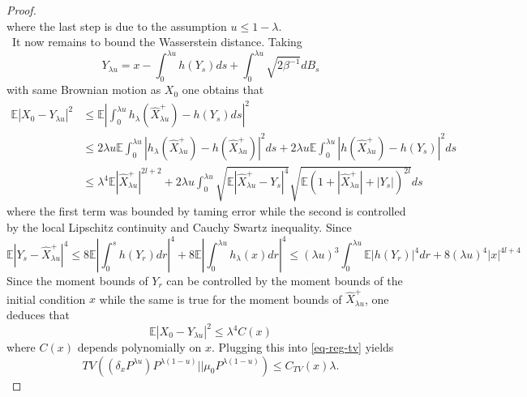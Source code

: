 \documentclass[10pt,a4paper]{amsart}
\newcommand{\E}{\mathbb{E}}
\begin{document}
\begin{proof}
\begin{equation}
 \end{equation}
 where the last step is due to the assumption $u\leq 1-\lambda.$\\\
 It now remains to bound the Wasserstein distance.
 Taking \[Y_{\lambda u}= x- \int_0^{\lambda u }h(Y_s) ds + \int_0^{\lambda u }\sqrt{2\beta^{-1}} dB_s \] with same Brownian motion as $X_0$ one obtains that 
 \[\begin{aligned}
     \E |X_0-Y_{\lambda u}|^2&\leq  \E |\int_0 ^{\lambda u} h_\lambda (\hat{X}^{+}_{\lambda u})-h(Y_s) ds|^2 \\&\leq  2 \lambda u \E \int_0 ^{\lambda u}| h_\lambda (\hat{X}^{+}_{\lambda u})-h(\hat{X}^{+}_{\lambda u})|^2 ds + 2 \lambda u \E \int_0 ^{\lambda u}| h (\hat{X}^{+}_{\lambda u})-h(Y_s)|^2 ds
     \\&\leq 
     \lambda^4 \E |\hat{X}^{+}_{\lambda u}|^{2l+2} + 2\lambda u \int_0^{\lambda u} \sqrt{\E |\hat{X}^{+}_{\lambda u}-Y_s|^4} \sqrt{\E (1+|\hat{X}^{+}_{\lambda u}|+ |Y_s|)^{2l}}ds \end{aligned}\]
     where the first term was bounded by taming error while the second is controlled by the local Lipschitz continuity and Cauchy Swartz inequality.
     Since \[\E |Y_s-\hat{X}^{+}_{\lambda u}|^4\leq 8 \E | \int_0^s h(Y_r)dr|^4 + 8 \E |\int_0^{\lambda u} h_\lambda (x)dr|^4\leq (\lambda u)^3 \int_0^{\lambda u} \E |h(Y_r)|^4 dr + 8 (\lambda u)^4 |x|^{4l+4}\]
     Since the moment bounds of $Y_r$ can be controlled by the moment bounds of the initial condition $x$ while the same is true for the moment bounds of $\hat{X}^{+}_{\lambda u}$, one deduces that 
    \[ \E |X_0-Y_{\lambda u}|^2\leq \lambda^4 C(x)\] where $C(x)$ depends polynomially on $x.$
   Plugging this into  \eqref{eq-reg-tv} yields
   \[TV ((\delta_xP^{\lambda u}) P^{\lambda (1-u)}|| \mu_0 P^{\lambda (1-u)})\leq C_{TV}(x)\lambda.\]

\end{proof}
\end{document}
